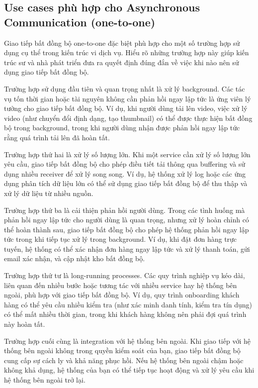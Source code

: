 \subsection{Use cases phù hợp cho Asynchronous Communication (one-to-one)}
Giao tiếp bất đồng bộ one-to-one đặc biệt phù hợp cho một số trường hợp sử dụng cụ thể trong kiến trúc vi dịch vụ. Hiểu rõ những trường hợp này giúp kiến trúc sư và nhà phát triển đưa ra quyết định đúng đắn về việc khi nào nên sử dụng giao tiếp bất đồng bộ.

Trường hợp sử dụng đầu tiên và quan trọng nhất là xử lý background. Các tác vụ tốn thời gian hoặc tài nguyên không cần phản hồi ngay lập tức là ứng viên lý tưởng cho giao tiếp bất đồng bộ. Ví dụ, khi người dùng tải lên video, việc xử lý video (như chuyển đổi định dạng, tạo thumbnail) có thể được thực hiện bất đồng bộ trong background, trong khi người dùng nhận được phản hồi ngay lập tức rằng quá trình tải lên đã hoàn tất.

Trường hợp thứ hai là xử lý số lượng lớn. Khi một service cần xử lý số lượng lớn yêu cầu, giao tiếp bất đồng bộ cho phép điều tiết tải thông qua buffering và sử dụng nhiều receiver để xử lý song song. Ví dụ, hệ thống xử lý log hoặc các ứng dụng phân tích dữ liệu lớn có thể sử dụng giao tiếp bất đồng bộ để thu thập và xử lý dữ liệu từ nhiều nguồn.

Trường hợp thứ ba là cải thiện phản hồi người dùng. Trong các tình huống mà phản hồi ngay lập tức cho người dùng là quan trọng, nhưng xử lý hoàn chỉnh có thể hoàn thành sau, giao tiếp bất đồng bộ cho phép hệ thống phản hồi ngay lập tức trong khi tiếp tục xử lý trong background. Ví dụ, khi đặt đơn hàng trực tuyến, hệ thống có thể xác nhận đơn hàng ngay lập tức và xử lý thanh toán, gửi email xác nhận, và cập nhật kho bất đồng bộ.

Trường hợp thứ tư là long-running processes. Các quy trình nghiệp vụ kéo dài, liên quan đến nhiều bước hoặc tương tác với nhiều service hay hệ thống bên ngoài, phù hợp với giao tiếp bất đồng bộ. Ví dụ, quy trình onboarding khách hàng có thể yêu cầu nhiều kiểm tra (như xác minh danh tính, kiểm tra tín dụng) có thể mất nhiều thời gian, trong khi khách hàng không nên phải đợi quá trình này hoàn tất.

Trường hợp cuối cùng là integration với hệ thống bên ngoài. Khi giao tiếp với hệ thống bên ngoài không trong quyền kiểm soát của bạn, giao tiếp bất đồng bộ cung cấp sự cách ly và khả năng phục hồi. Nếu hệ thống bên ngoài chậm hoặc không khả dụng, hệ thống của bạn có thể tiếp tục hoạt động và xử lý yêu cầu khi hệ thống bên ngoài trở lại.


